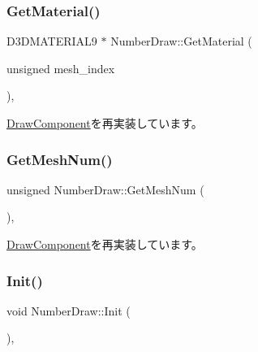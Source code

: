\subsubsection{\texorpdfstring{Get\+Material()}{GetMaterial()}}
{\footnotesize\ttfamily D3\+D\+M\+A\+T\+E\+R\+I\+A\+L9 $\ast$ Number\+Draw\+::\+Get\+Material (\begin{DoxyParamCaption}\item[{unsigned}]{mesh\+\_\+index }\end{DoxyParamCaption})\hspace{0.3cm}{\ttfamily [override]}, {\ttfamily [virtual]}}



\mbox{\hyperlink{class_draw_component_adae078d5139f691997763bf6cac9e25a}{Draw\+Component}}を再実装しています。

\mbox{\label{class_number_draw_ace379e39f5646b4d04f3fc9cc1beea1a}} 
\subsubsection{\texorpdfstring{Get\+Mesh\+Num()}{GetMeshNum()}}
{\footnotesize\ttfamily unsigned Number\+Draw\+::\+Get\+Mesh\+Num (\begin{DoxyParamCaption}{ }\end{DoxyParamCaption})\hspace{0.3cm}{\ttfamily [override]}, {\ttfamily [virtual]}}



\mbox{\hyperlink{class_draw_component_a5f3bbcc8e563b740c0a5535170921c75}{Draw\+Component}}を再実装しています。

\mbox{\label{class_number_draw_ad52c1e8b9ae6e830a82c440cc18cb6c9}} 
\subsubsection{\texorpdfstring{Init()}{Init()}}
{\footnotesize\ttfamily void Number\+Draw\+::\+Init (\begin{DoxyParamCaption}{ }\end{DoxyParamCaption})\hspace{0.3cm}{\ttfamily [override]}, {\ttfamily [virtual]}}



